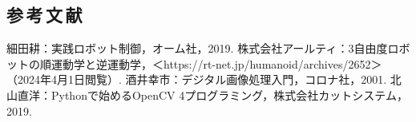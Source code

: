 \newpage
\begin{center}
	\section*{参\,考\,文\,献}                      %
\end{center}

\begin{thebibliography}{9}
	 細田耕：実践ロボット制御，オーム社，2019.
	 株式会社アールティ：3自由度ロボットの順運動学と逆運動学，＜https://rt-net.jp/humanoid/archives/2652＞（2024年4月1日閲覧）.
	 酒井幸市：デジタル画像処理入門，コロナ社，2001.
	 北山直洋：Pythonで始めるOpenCV 4プログラミング，株式会社カットシステム，2019.
\end{thebibliography}


